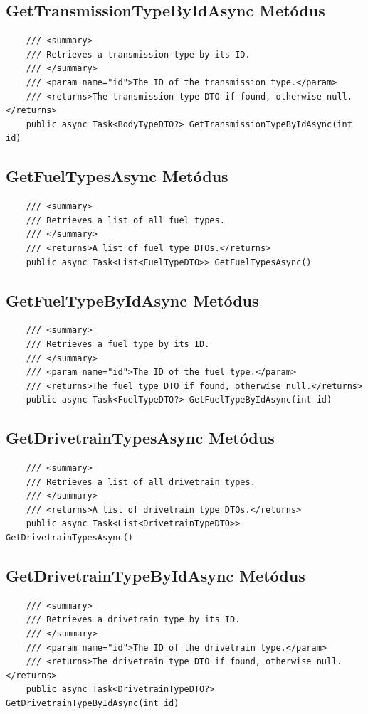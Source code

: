 \documentclass{report}[11pt]
\begin{document}
\subsection*{GetTransmissionTypeByIdAsync Metódus}
\begin{lstlisting}
    /// <summary>
    /// Retrieves a transmission type by its ID.
    /// </summary>
    /// <param name="id">The ID of the transmission type.</param>
    /// <returns>The transmission type DTO if found, otherwise null.</returns>
    public async Task<BodyTypeDTO?> GetTransmissionTypeByIdAsync(int id)
\end{lstlisting}

\subsection*{GetFuelTypesAsync Metódus}
\begin{lstlisting}
    /// <summary>
    /// Retrieves a list of all fuel types.
    /// </summary>
    /// <returns>A list of fuel type DTOs.</returns>
    public async Task<List<FuelTypeDTO>> GetFuelTypesAsync()
\end{lstlisting}

\subsection*{GetFuelTypeByIdAsync Metódus}
\begin{lstlisting}
    /// <summary>
    /// Retrieves a fuel type by its ID.
    /// </summary>
    /// <param name="id">The ID of the fuel type.</param>
    /// <returns>The fuel type DTO if found, otherwise null.</returns>
    public async Task<FuelTypeDTO?> GetFuelTypeByIdAsync(int id)
\end{lstlisting}

\subsection*{GetDrivetrainTypesAsync Metódus}
\begin{lstlisting}
    /// <summary>
    /// Retrieves a list of all drivetrain types.
    /// </summary>
    /// <returns>A list of drivetrain type DTOs.</returns>
    public async Task<List<DrivetrainTypeDTO>> GetDrivetrainTypesAsync()
\end{lstlisting}

\subsection*{GetDrivetrainTypeByIdAsync Metódus}
\begin{lstlisting}
    /// <summary>
    /// Retrieves a drivetrain type by its ID.
    /// </summary>
    /// <param name="id">The ID of the drivetrain type.</param>
    /// <returns>The drivetrain type DTO if found, otherwise null.</returns>
    public async Task<DrivetrainTypeDTO?> GetDrivetrainTypeByIdAsync(int id)
\end{lstlisting}
\end{document}
